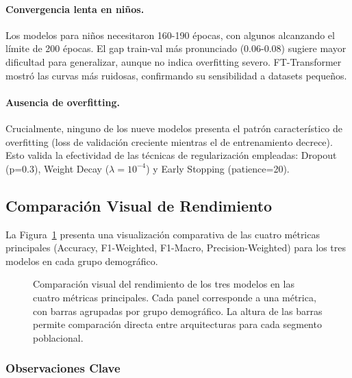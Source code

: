 \documentclass[12pt,a4paper]{article}
\begin{document}
\paragraph{Convergencia lenta en niños.} Los modelos para niños necesitaron 160-190 épocas, con algunos alcanzando el límite de 200 épocas. El gap train-val más pronunciado (0.06-0.08) sugiere mayor dificultad para generalizar, aunque no indica overfitting severo. FT-Transformer mostró las curvas más ruidosas, confirmando su sensibilidad a datasets pequeños.

\paragraph{Ausencia de overfitting.} Crucialmente, ninguno de los nueve modelos presenta el patrón característico de overfitting (loss de validación creciente mientras el de entrenamiento decrece). Esto valida la efectividad de las técnicas de regularización empleadas: Dropout (p=0.3), Weight Decay ($\lambda=10^{-4}$) y Early Stopping (patience=20).


\subsection{Comparación Visual de Rendimiento}

La Figura~\ref{fig:model_comparison} presenta una visualización comparativa de las cuatro métricas principales (Accuracy, F1-Weighted, F1-Macro, Precision-Weighted) para los tres modelos en cada grupo demográfico.

\begin{figure}[H]
\centering
{}
\caption{Comparación visual del rendimiento de los tres modelos en las cuatro métricas principales. Cada panel corresponde a una métrica, con barras agrupadas por grupo demográfico. La altura de las barras permite comparación directa entre arquitecturas para cada segmento poblacional.}
\label{fig:model_comparison}
\end{figure}

\subsubsection{Observaciones Clave}
\end{document}

